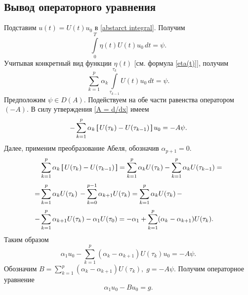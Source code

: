 \documentclass{article}
\newcommand{\h}{\textsf}
\theoremstyle{definition}
\begin{document}
\subsection{Вывод операторного уравнения} %
Подставим $ u(t) = U(t)u_0 $ в \eqref{abstarct integral}. Получим 
\begin{equation*}
	\int\limits_{0}^{T} \eta(t)U(t)u_0\,dt = \psi.
\end{equation*}
Учитывая конкретный вид функции $\eta(t)$ [см. формула \eqref{eta(t)}], получим
\begin{equation*}
	\sum\limits_{k = 1}^{p} \alpha_k \int\limits_{\tau_{k - 1}}^{\tau_k} U(t)u_0\,dt = \psi.
\end{equation*}
Предположим $\psi \in D(A)$. Подействуем на обе части равенства оператором $(-A)$. В силу утверждения \ref{A = d/dx} имеем
\begin{equation*} 
	-\sum\limits_{k = 1}^{p} \alpha_k \,\h[\, U(\tau_k) - U(\tau_{k - 1}) \,\h]\, u_0 = -A\psi.
\end{equation*}
Далее, применим преобразование Абеля, обозначив $ \alpha_{p + 1} = 0 $.
\begin{equation*}
\begin{aligned}
	  & \sum\limits_{k = 1}^{p} \alpha_k \,\h[\, U(\tau_k) - U(\tau_{k - 1}) \,\h] = \sum\limits_{k = 1}^{p} \alpha_k U(\tau_k) - 
		\sum\limits_{k = 1}^{p} \alpha_k U(\tau_{k - 1}) = \\[1mm]
	= & \sum\limits_{k = 1}^{p} \alpha_k U(\tau_k)\, - \sum\limits_{k = 0}^{p - 1} \alpha_{k + 1} U(\tau_k) = 
	\sum\limits_{k = 1}^{p} \alpha_k U(\tau_k)\, - \\[1mm]
	- & \sum\limits_{k = 1}^{p} \alpha_{k + 1} U(\tau_k) - \alpha_1 U(\tau_0) = 
		-\alpha_1 + \sum\limits_{k = 1}^{p} (\alpha_k - \alpha_{k + 1})U(\tau_k).
\end{aligned}
\end{equation*}
Таким образом
\begin{equation*}
	\alpha_1 u_0 - \sum\limits_{k = 1}^{p} (\alpha_k - \alpha_{k + 1})U(\tau_k)u_0 = -A\psi.
\end{equation*}
Обозначим $ B = \sum\limits_{k = 1}^{p} (\alpha_k - \alpha_{k + 1})U(\tau_k), \; g = -A\psi $. Получим операторное уравнение
\begin{equation} \label{operator equation}
	\alpha_1 u_0 - Bu_0 = g.
\end{equation}
\end{document}
